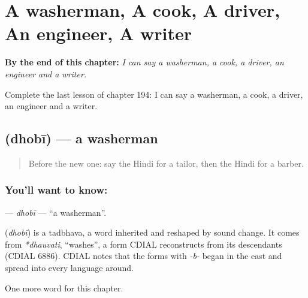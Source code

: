 
\chapter{A washerman, A cook, A driver, An engineer, A writer}
\label{ch:hi-a-washerman-a-cook-a-driver-an-engineer-a-writer}

\begin{chapteropening}
\textbf{By the end of this chapter:} \emph{I can say a washerman, a cook, a driver, an engineer and a writer.}

Complete the last lesson of chapter 194: I can say a washerman, a cook, a driver, an engineer and a writer.
\end{chapteropening}

\section[\texorpdfstring{\hi{धोबी} (dhobī)}{धोबी (dhobī)}]{ (dhobī) — a washerman}

\label{lesson:HI-C194-dhobi}



\begin{quote}
Before the new one: say the Hindi for a tailor, then the Hindi for a barber.
\end{quote}

\subsection*{You'll want to know: }
\textbf{} — \emph{dhobī} — \textquotedblleft{}a washerman\textquotedblright{}.

\begin{cousinweb}
\textbf{} (\emph{dhobī}) is a tadbhava, a word inherited and reshaped by sound change. It comes from \emph{*dhauvati}, \textquotedblleft{}washes\textquotedblright{}, a form CDIAL reconstructs from its descendants (CDIAL 6886). CDIAL notes that the forms with \emph{-b-} began in the east and spread into every language around.
\end{cousinweb}

\begin{grammarlens}[title={What you've built}]
One more word for this chapter.
\end{grammarlens}

